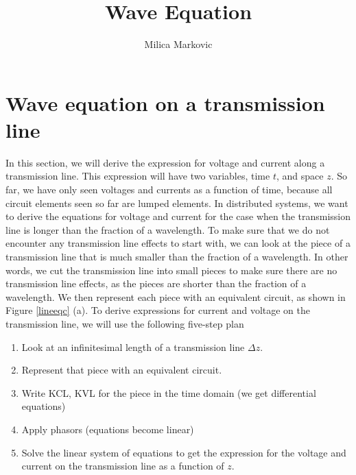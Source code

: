 \documentclass{ximera}
\title{Wave Equation}
\author{Milica Markovic}
\begin{document}
  
\begin{abstract}  

\end{abstract}  
\maketitle    




\section{ Wave equation on a transmission line}\label{telegrapher}

In this section, we will derive the expression for voltage and current
along a transmission line. This expression will have two variables, time $t$, and space $z$. 
So far, we have only seen voltages and currents as a function of time, because all circuit elements seen so far are lumped elements. In distributed systems,
we want to derive the equations for voltage and current for the case when the transmission
line is longer than the fraction of a wavelength.  To make sure that we
do not encounter any transmission line effects to start with, we can
look at the piece of a transmission line that is much smaller than
the fraction of a wavelength. In other words, we cut the transmission
line into small pieces to make sure there are no transmission line
effects, as the pieces are shorter than the fraction of a wavelength. We then represent each piece with
an equivalent circuit, as shown in Figure \ref{lineeqc} (a). 
To derive expressions for current and voltage on the transmission line, we will use the following five-step plan

\begin{enumerate}
\item Look at an infinitesimal length of a transmission line $\Delta z$.  

\item Represent that piece with an equivalent circuit. 

\item Write KCL, KVL for the piece in the time domain (we get
differential equations)

\item Apply phasors (equations become linear)

\item Solve the linear system of equations to get the expression for
the voltage and current on the transmission line as a function of $z$.

\end{enumerate}
\end{document}
